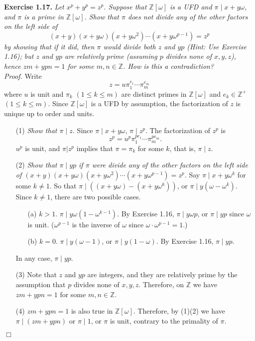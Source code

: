 \documentclass{article}
\begin{document}
\textbf{Exercise 1.17.}
\emph{Let $x^p + y^p = z^p$.
Suppose that $\mathbb{Z}[\omega]$ is a UFD and $\pi \mid x + y\omega$,
and $\pi$ is a prime in $\mathbb{Z}[\omega]$.
Show that $\pi$ does not divide any of the other factors on the left side of
$$(x+y)(x+y\omega)(x+y\omega^2) \cdots (x+y\omega^{p-1}) = z^p$$
by showing that if it did, then $\pi$ would divide both $z$ and $yp$
(Hint: Use Exercise 1.16);
but $z$ and $yp$ are relatively prime (assuming $p$ divides none of $x, y, z$),
hence $zm + ypn = 1$ for some $m, n \in \mathbb{Z}$.
How is this a contradiction? } \\

\emph{Proof.}
Write $$z = u {\pi}_1^{e_1} \cdots {\pi}_m^{e_m}$$ where
$u$ is unit and $\pi_k$ $(1 \leq k \leq m)$ are distinct primes in $\mathbb{Z}[\omega]$ and
$e_k \in \mathbb{Z}^+$ $(1 \leq k \leq m)$.
Since $\mathbb{Z}[\omega]$ is a UFD by assumption,
the factorization of $z$ is unique up to order and units.
\begin{enumerate}
\item[(1)]
\emph{Show that $\pi \mid z$.}
Since $\pi \mid x + y\omega$, $\pi \mid z^p$.
The factorization of $z^p$ is
$$z^p = u^p {\pi}_1^{pe_1} \cdots {\pi}_m^{pe_m}.$$
$u^p$ is unit, and $\pi | z^p$ implies that $\pi = \pi_k$ for some $k$,
that is, $\pi \mid z$.
\item[(2)]
\emph{Show that $\pi \mid yp$ if $\pi$ were divide any of
the other factors on the left side of
$(x+y)(x+y\omega)(x+y\omega^2) \cdots (x+y\omega^{p-1}) = z^p$.}
Say $\pi \mid x+y\omega^k$ for some $k \neq 1$.
So that $\pi \mid ((x+y\omega) - (x+y\omega^k))$,
or $\pi \mid y(\omega - \omega^k)$.
Since $k \neq 1$, there are two possible cases.
  \begin{enumerate}
  \item[(a)]
  $k > 1$. $\pi \mid y\omega(1 - \omega^{k-1})$.
  By Exercise 1.16, $\pi \mid y\omega p$, or $\pi \mid yp$ since $\omega$ is unit.
  ($\omega^{p-1}$ is the inverse of $\omega$ since $\omega \cdot \omega^{p-1} = 1$.)
  \item[(b)]
  $k = 0$. $\pi \mid y(\omega - 1)$, or $\pi \mid y(1 - \omega)$.
  By Exercise 1.16, $\pi \mid yp$.
  \end{enumerate}
In any case, $\pi \mid yp$.
\item[(3)]
Note that $z$ and $yp$ are integers, and they are relatively prime by the assumption
that $p$ divides none of $x, y, z$.
Therefore, on $\mathbb{Z}$ we have $zm + ypn = 1$ for some $m, n \in \mathbb{Z}$.
\item[(4)]
$zm + ypn = 1$ is also true in $\mathbb{Z}[\omega]$.
Therefore, by (1)(2) we have $\pi \mid (zm + ypn)$ or $\pi \mid 1$,
or $\pi$ is unit, contrary to the primality of $\pi$.
\end{enumerate}
$\Box$ \\\\
\end{document}
